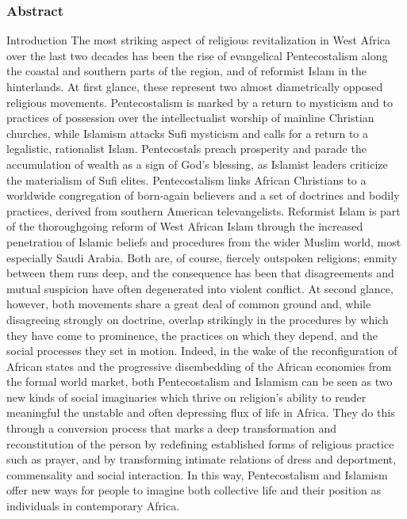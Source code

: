 \subsubsection*{Abstract}
Introduction The most striking aspect of religious revitalization in West Africa over the last two decades has been the rise of evangelical Pentecostalism along the coastal and southern parts of the region, and of reformist Islam in the hinterlands. At first glance, these represent two almost diametrically opposed religious movements. Pentecostalism is marked by a return to mysticism and to practices of possession over the intellectualist worship of mainline Christian churches, while Islamism attacks Sufi mysticism and calls for a return to a legalistic, rationalist Islam. Pentecostals preach prosperity and parade the accumulation of wealth as a sign of God's blessing, as Islamist leaders criticize the materialism of Sufi elites. Pentecostalism links African Christians to a worldwide congregation of born-again believers and a set of doctrines and bodily practices, derived from southern American televangelists. Reformist Islam is part of the thoroughgoing reform of West African Islam through the increased penetration of Islamic beliefs and procedures from the wider Muslim world, most especially Saudi Arabia. Both are, of course, fiercely outspoken religions; enmity between them runs deep, and the consequence has been that disagreements and mutual suspicion have often degenerated into violent conflict. At second glance, however, both movements share a great deal of common ground and, while disagreeing strongly on doctrine, overlap strikingly in the procedures by which they have come to prominence, the practices on which they depend, and the social processes they set in motion. Indeed, in the wake of the reconfiguration of African states and the progressive disembedding of the African economies from the formal world market, both Pentecostalism and Islamism can be seen as two new kinds of social imaginaries which thrive on religion's ability to render meaningful the unstable and often depressing flux of life in Africa. They do this through a conversion process that marks a deep transformation and reconstitution of the person by redefining established forms of religious practice such as prayer, and by transforming intimate relations of dress and deportment, commensality and social interaction. In this way, Pentecostalism and Islamism offer new ways for people to imagine both collective life and their position as individuals in contemporary Africa.

